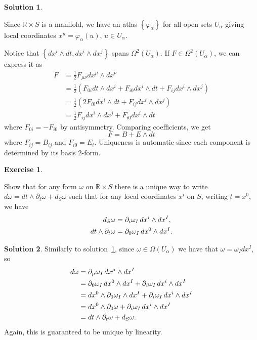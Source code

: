 \documentclass[11pt, a4paper]{report}
\theoremstyle{definition}
\newtheorem{exercise}{Exercise}[part]
\newtheorem{solution}{Solution}[part]
\newenvironment{ex}{\begin{exercise}}{\end{exercise}\pagebreak[1]}
\newenvironment{sol}{\begin{solution}}{\end{solution}\pagebreak[3]}
\renewcommand*{\d}{\ensuremath\mathop{}\mathopen{}d}
\begin{document}
\begin{sol}\label{sol:bplusedt}

Since $\mathbb{R} \times S$ is a manifold, we have an atlas $\left\{\varphi_\alpha\right\}$ for all open sets $U_\alpha$ giving local coordinates $x^\mu = \varphi_\alpha(u)$, $u \in U_\alpha$.

Notice that $\left\{dx^i \wedge dt, dx^i \wedge dx^j\right\}$ spans $\Omega^2(U_\alpha)$.
If $F \in \Omega^2(U_\alpha)$, we can express it as
\begin{align*}
    F &= \frac{1}{2} F_{\mu\nu}dx^\mu \wedge dx^\nu \\
      &= \frac{1}{2} \left( F_{0i} dt \wedge dx^i + F_{i0} dx^i \wedge dt + F_{ij} dx^i \wedge dx^j \right) \\
      &= \frac{1}{2} \left( 2 F_{i0} dx^i \wedge dt + F_{ij} dx^i \wedge dx^j \right) \\
      &= \frac{1}{2} F_{ij} dx^i \wedge dx^j + F_{i0} dx^i \wedge dt
\end{align*}
where $F_{0i} = -F_{i0}$ by antisymmetry. Comparing coefficients, we get
\[
    F = B + E \wedge dt
\]
where $F_{ij} = B_{ij}$ and $F_{i0} = E_i$. Uniqueness is automatic since each component is determined by its basis 2-form.

\end{sol}

\begin{ex}\label{ex:pformspaceandtime}

Show that for any form $\omega$ on $\mathbb{R} \times S$ there is a unique way to write $d\omega = dt \wedge \partial_t \omega + d_S \omega$ such that for any local coordinates $x^i$ on $S$, writing $t = x^0$, we have
\begin{align*}
    d_S\omega &= \partial_i \omega_I \d x^i \wedge dx^I, \\
    dt \wedge \partial_t \omega &= \partial_0 \omega_I \d x^0 \wedge dx^I.
\end{align*}

\end{ex}

\begin{sol}

Similarly to solution~\ref{sol:bplusedt}, since $\omega \in \Omega(U_\alpha)$ we have that $\omega = \omega_I dx^I$, so
\begin{align*}
    d\omega &= \partial_\mu \omega_I \d x^\mu \wedge dx^I \\
        &= \partial_0 \omega_I \d x^0 \wedge dx^I + \partial_i \omega_I \d x^i \wedge dx^I \\
        &= dx^0 \wedge \partial_0 \omega_I \wedge dx^I + \partial_i \omega_I \d x^i \wedge dx^I \\
        &= dx^0 \wedge \partial_0 \omega + \partial_i \omega_I \d x^i \wedge dx^I \\
        &= dt \wedge \partial_t \omega + d_S \omega.
\end{align*}
Again, this is guaranteed to be unique by linearity.

\end{sol}
\end{document}
